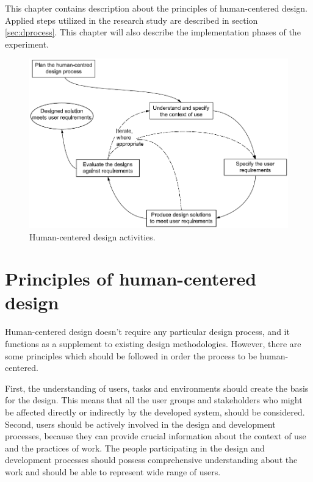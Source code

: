 \documentclass[12pt,a4paper,oneside,pdftex]{report}
\begin{document}
This chapter contains description about the principles of human-centered design. Applied steps utilized in the research study are described in section \ref{sec:dprocess}. This chapter will also describe the implementation phases of the experiment. 

\begin{figure}[H]
  	\centering
    	\includegraphics[width=1.0\textwidth]{./images/hci_process.png}
  	\caption{Human-centered design activities.\cite{RefWorks:16}}
	\label{fig:hci_process}
\end{figure}

\section{Principles of human-centered design}
Human-centered design doesn't require any particular design process, and it functions as a supplement to existing design methodologies. However, there are some principles which should be followed in order the process to be human-centered. 

First, the understanding of users, tasks and environments should create the basis for the design. This means that all the user groups and stakeholders who might be affected directly or indirectly by the developed system, should be considered.  Second, users should be actively	involved in the design and development processes, because they can provide crucial information about the context of use and the practices of work. The people participating in the design and development processes should possess comprehensive understanding about the work and should be able to represent wide range of users.  


\cite{RefWorks:16}
\end{document}

